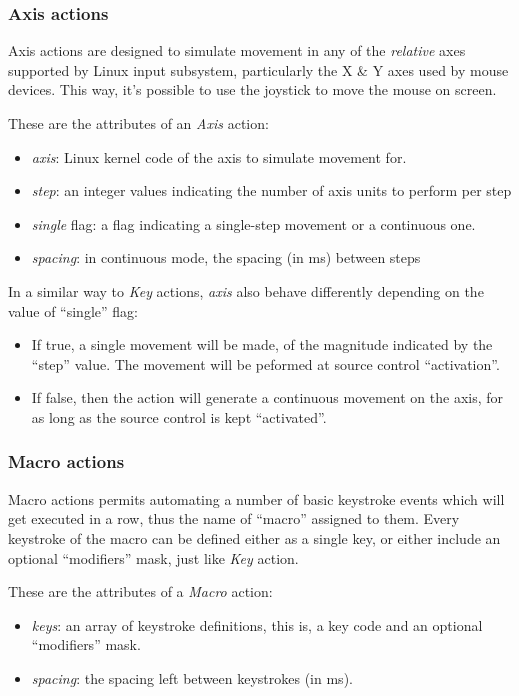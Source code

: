 \subsubsection{Axis actions}
Axis actions are designed to simulate movement in any of the \emph{relative} axes supported by Linux input subsystem, particularly the X \& Y axes used by mouse devices. This way, it's possible to use the joystick to move the mouse on screen.

These are the attributes of an \emph{Axis} action:
\begin{itemize}
	\item \emph{axis}: Linux kernel code of the axis to simulate movement for.
	\item \emph{step}: an integer values indicating the number of axis units to perform per step
	\item \emph{single} flag: a flag indicating a single-step movement or a continuous one.
	\item \emph{spacing}: in continuous mode, the spacing (in ms) between steps
\end{itemize}

In a similar way to \emph{Key} actions, \emph{axis} also behave differently depending on the value of ``single'' flag:
\begin{itemize}
	\item If true, a single movement will be made, of the magnitude indicated by the ``step'' value. The movement will be peformed at source control ``activation''.
	\item If false, then the action will generate a continuous movement on the axis, for as long as the source control is kept ``activated''.
\end{itemize}


\subsubsection{Macro actions}
Macro actions permits automating a number of basic keystroke events which will get executed in a row, thus the name of ``macro'' assigned to them. Every keystroke of the macro can be defined either as a single key, or either include an optional ``modifiers'' mask, just like \emph{Key} action.

These are the attributes of a \emph{Macro} action:
\begin{itemize}
	\item \emph{keys}: an array of keystroke definitions, this is, a key code and an optional ``modifiers'' mask.
	\item \emph{spacing}: the spacing left between keystrokes (in ms).
\end{itemize}


